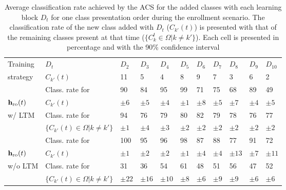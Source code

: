 \begin{table}[t]
  \small
  \centering
  \caption{Average classification rate achieved by the ACS for the added classes with each learning block $D_t$ for one class presentation order during the enrollment scenario. The classification rate of the new class added with $D_t$ ($C_{k'}(t)$) is presented with that of the remaining classes present at that time ($\{C_k^t\in \Omega|k\neq k'\}$). Each cell is presented in percentage and with the 90\% confidence interval}
  \begin{tabular}{|l|l|lllllllll|}
  	\hline
		Training & $D_t$ & $D_{2}$ & $D_{3}$ & $D_{4}$ & $D_{5}$ & $D_{6}$ & $D_{7}$ & $D_{8}$ & $D_{9}$ & $D_{10}$\\\cline{2-11}
		strategy & $C_{k'}(t)$ &  11 &  5 &  4 &  8 &  9 &  7 &  3 &  6 &  2
		\\ \hline \hline

		 & Class. rate for & 90 & 84 & 95 & 99 & 71 & 75 & 68 & 89 & 49	\\ 
		$\textbf{h}_\textnormal{ro}(t)$ & $C_{k'}(t)$ & $\pm 6$ &$\pm 5$ &$\pm 4$ &$\pm 1$ &$\pm 8$ &$\pm 5$ & $\pm 7$ & $\pm 4$ & $\pm 5$	\\ \cline{2-11} 
		w/ LTM &  Class. rate for & 94 & 76 & 79 & 80 & 82 & 79 & 78 & 76 & 77 \\ 
		& $\{C_{k'}(t)\in\Omega|k\neq k'\}$ & $\pm 1$ & $\pm 4$ & $\pm 3$ & $\pm 2$
		& $\pm 2$ & $\pm 2$ & $\pm 2$ & $\pm 2$ & $\pm 2$
		\\ \hline
		
		 & Class. rate for & 100 & 95 & 96 & 98 & 87 & 88 & 77 & 91 & 72 \\ 
		$\textbf{h}_\textnormal{ro}(t)$ & $C_{k'}(t)$ & $\pm 1$ & $\pm 2$ & $\pm 2$ & $\pm 1$ & $\pm 4$ & $\pm 4$ & $\pm 13$ & $\pm 7$ & $\pm 11$	\\ \cline{2-11} 
		w/o LTM & Class. rate for & 31 & 36 & 54 & 61 & 48 & 51 & 56 & 47 & 52 \\ 
		& $\{C_{k'}(t)\in\Omega|k\neq k'\}$ &$\pm 22$ &$\pm 16$ &$\pm 10$ &$\pm 8$
		& $\pm 6$ & $\pm 9$ & $\pm 9$ & $\pm 6$ & $\pm 6$
		\\ \hline
	\end{tabular}
	\label{tab:c1_AddEvo}
\end{table}

